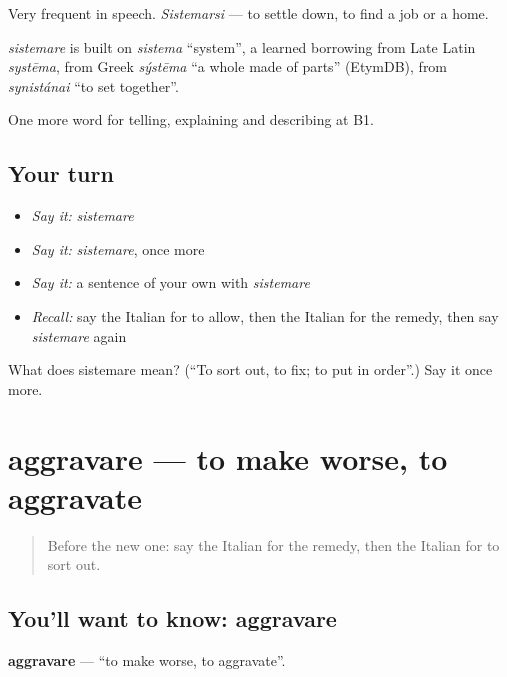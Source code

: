 Very frequent in speech. \emph{Sistemarsi} — to settle down, to find a job or a home.

\begin{cousinweb}
\emph{sistemare} is built on \emph{sistema} \textquotedblleft{}system\textquotedblright{}, a learned borrowing from Late Latin \emph{systēma}, from Greek \emph{sýstēma} \textquotedblleft{}a whole made of parts\textquotedblright{} (EtymDB), from \emph{synistánai} \textquotedblleft{}to set together\textquotedblright{}.
\end{cousinweb}

\begin{grammarlens}[title={What you've built}]
One more word for telling, explaining and describing at B1.
\end{grammarlens}

\subsection*{Your turn}
\begin{itemize}
\raggedright
  \item \emph{Say it:} \emph{sistemare}
  \item \emph{Say it:} \emph{sistemare}, once more
  \item \emph{Say it:} a sentence of your own with \emph{sistemare}
  \item \emph{Recall:} say the Italian for to allow, then the Italian for the remedy, then say \emph{sistemare} again
\end{itemize}

\begin{tcolorbox}[breakable,colback=teal!4,colframe=teal!35!black,title={Before you move on}]
What does sistemare mean? (\textquotedblleft{}To sort out, to fix; to put in order\textquotedblright{}.) Say it once more.
\end{tcolorbox}
\section[aggravare]{aggravare — to make worse, to aggravate}

\label{lesson:IT-C355-aggravare}



\begin{quote}
Before the new one: say the Italian for the remedy, then the Italian for to sort out.
\end{quote}

\subsection*{You'll want to know: aggravare}
\textbf{aggravare} — \textquotedblleft{}to make worse, to aggravate\textquotedblright{}.

